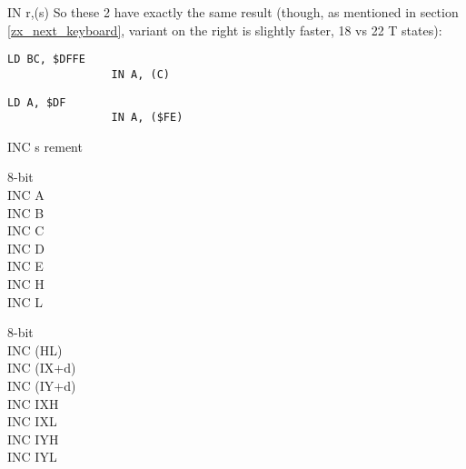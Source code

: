 \documentclass[12pt,twoside,openright,a4paper]{book}
\begin{document}
\begin{basedescript}{
	\desclabelstyle{\multilinelabel}
	\desclabelwidth{3cm}}
\begin{DetailItem}{IN r,(s)}
		So these 2 have exactly the same result (though, as mentioned in section \ref{zx_next_keyboard}, variant on the right is slightly faster, 18 vs 22 T states):

		\begin{multicols}{2}
			\begin{lstlisting}[autogobble=true, xrightmargin=1em]
				LD BC, $DFFE
				IN A, (C)
			\end{lstlisting}
			\columnbreak
			\begin{lstlisting}[autogobble=true]
				LD A, $DF
				IN A, ($FE)
			\end{lstlisting}
		\end{multicols}

		\begin{DetailEffects}[p]
			\FlagsINrc[\tt IN r,(C)]
			\FlagsINan[{\tt IN A,(n)} (no effect)]
		\end{DetailEffects}
						
		\begin{DetailTiming}
		\end{DetailTiming}



	\end{DetailItem}

	\pagebreak
	\begin{DetailItem}{INC s}
		{rement}
		{}

		\begin{DetailVariants}
			\textnormal{8-bit}\\
			INC A\\
			INC B\\
			INC C\\
			INC D\\
			INC E\\
			INC H\\
			INC L

			\textnormal{8-bit}\\
			INC (HL)\\
			INC (IX+d)\\
			INC (IY+d)\\
			INC IXH\UNDOC\\
			INC IXL\UNDOC\\
			INC IYH\UNDOC\\
			INC IYL\UNDOC


\end{DetailVariants}
\end{DetailItem}
\end{basedescript}
\end{document}
